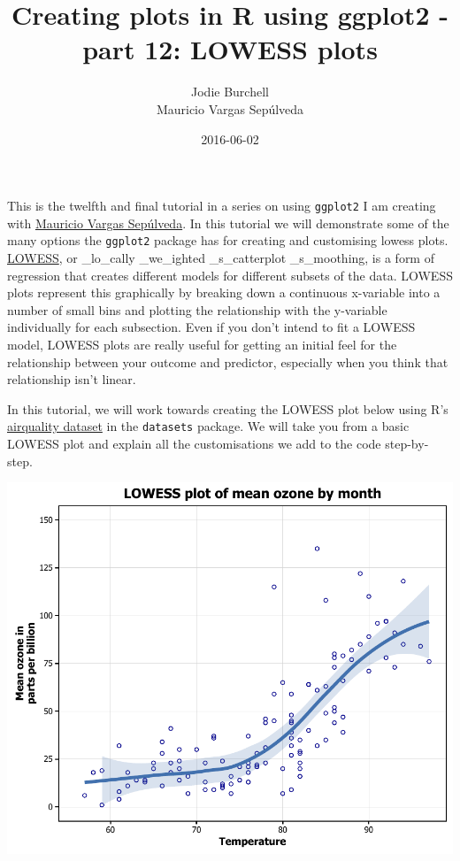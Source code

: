 \documentclass[]{article}
\title{Creating plots in R using ggplot2 - part 12: LOWESS plots}
\author{Jodie Burchell \\ Mauricio Vargas Sepúlveda}
\date{2016-06-02}
\begin{document}
\maketitle

This is the twelfth and final tutorial in a series on using
\texttt{ggplot2} I am creating with
\href{http://pachamaltese.github.io/}{Mauricio Vargas Sepúlveda}. In
this tutorial we will demonstrate some of the many options the
\texttt{ggplot2} package has for creating and customising lowess plots.
\href{https://en.wikipedia.org/wiki/Local_regression}{LOWESS}, or
\_lo\_cally \_we\_ighted \_s\_catterplot \_s\_moothing, is a form of
regression that creates different models for different subsets of the
data. LOWESS plots represent this graphically by breaking down a
continuous x-variable into a number of small bins and plotting the
relationship with the y-variable individually for each subsection. Even
if you don't intend to fit a LOWESS model, LOWESS plots are really
useful for getting an initial feel for the relationship between your
outcome and predictor, especially when you think that relationship isn't
linear.

In this tutorial, we will work towards creating the LOWESS plot below
using R's
\href{https://stat.ethz.ch/R-manual/R-devel/library/datasets/html/airquality.html}{airquality
dataset} in the \texttt{datasets} package. We will take you from a basic
LOWESS plot and explain all the customisations we add to the code
step-by-step.

\begin{center}\includegraphics{12_Lowess_Plots_pdf/lowess_final-1} \end{center}
\end{document}
